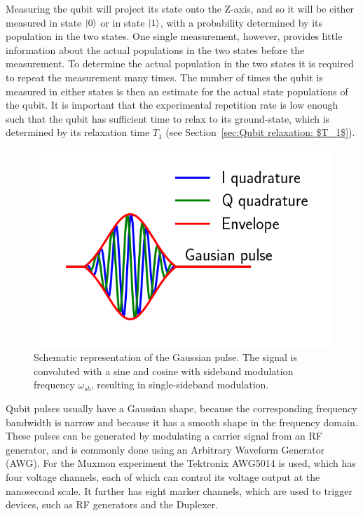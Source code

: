         Measuring the qubit will project its state onto the Z-axis, and so it will be either measured in state $\ket{0}$ or in state $\ket{1}$, with a probability determined by its population in the two states. One single measurement, however, provides little information about the actual populations in the two states before the measurement. To determine the actual population in the two states it is required to repeat the measurement many times. The number of times the qubit is measured in either states is then an estimate for the actual state populations of the qubit. It is important that the experimental repetition rate is low enough such that the qubit has sufficient time to relax to its ground-state, which is determined by its relaxation time $T_1$ (see Section~\ref{sec:Qubit relaxation: $T_1$}).

        \begin{figure}
          \begin{center}
          \vspace{-30pt}
            \includegraphics[width=\textwidth]{../Figures/Exploring frequency re-use/Gaussian pulse.png}
          \end{center}
          \vspace{-20 pt}
          \caption{Schematic representation of the Gaussian pulse. The signal is convoluted with a sine and cosine with sideband modulation frequency $\omega_{sb}$, resulting in single-sideband modulation.}
          \label{fig:gaussian pulse}
        \end{figure}

        Qubit pulses usually have a Gaussian shape, because the corresponding frequency bandwidth is narrow and because it has a smooth shape in the frequency domain. These pulses can be generated by modulating a carrier signal from an RF generator, and is commonly done using an Arbitrary Waveform Generator (AWG). For the Muxmon experiment the Tektronix AWG5014 is used, which has four voltage channels, each of which can control its voltage output at the nanosecond scale. It further has eight marker channels, which are used to trigger devices, such as RF generators and the Duplexer.

